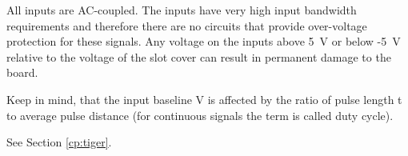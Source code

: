 	All inputs are AC-coupled. The inputs have very high input bandwidth requirements and therefore there are no circuits that provide over-voltage protection for these signals. 
	Any voltage on the inputs above \SI{5}{\volt} or below -\SI{5}{\volt} relative to the voltage of the slot cover can result in permanent damage to the board.\par 
    Keep in mind, that the input baseline \textsf{V} is affected by the ratio of pulse length \textsf{t} to average pulse distance (for continuous signals the term is called duty cycle).\par
See Section \ref{cp:tiger}. 


